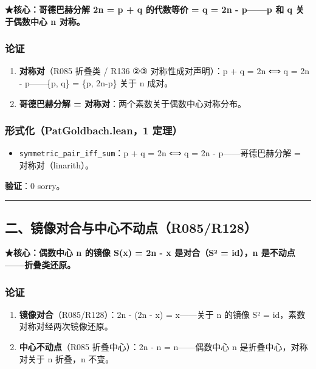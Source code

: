 \documentclass[
]{article}
\providecommand{\tightlist}{%
  \setlength{\itemsep}{0pt}\setlength{\parskip}{0pt}}
\begin{document}
\textbf{★核心：哥德巴赫分解 2n = p + q 的代数等价 = q = 2n - p------p 和
q 关于偶数中心 n 对称。}

\subsubsection{论证}\label{ux8bbaux8bc1}

\begin{enumerate}
\def\labelenumi{\arabic{enumi}.}
\tightlist
\item
  \textbf{对称对}（R085 折叠类 / R136 ②③ 对称性成对声明）：p + q = 2n ⟺
  q = 2n - p------\{p, q\} = \{p, 2n-p\} 关于 n 成对。
\item
  \textbf{哥德巴赫分解 = 对称对}：两个素数关于偶数中心对称分布。
\end{enumerate}

\subsubsection{形式化（PatGoldbach.lean，1
定理）}\label{ux5f62ux5f0fux5316patgoldbach.lean1-ux5b9aux7406}

\begin{itemize}
\tightlist
\item
  \texttt{symmetric\_pair\_iff\_sum}：p + q = 2n ⟺ q = 2n -
  p------哥德巴赫分解 = 对称对（linarith）。
\end{itemize}

\textbf{验证}：0 sorry。

\begin{center}\rule{0.5\linewidth}{0.5pt}\end{center}

\subsection{二、镜像对合与中心不动点（R085/R128）}\label{ux4e8cux955cux50cfux5bf9ux5408ux4e0eux4e2dux5fc3ux4e0dux52a8ux70b9r085r128}

\textbf{★核心：偶数中心 n 的镜像 S(x) = 2n - x 是对合（S² = id），n
是不动点------折叠类还原。}

\subsubsection{论证}\label{ux8bbaux8bc1-1}

\begin{enumerate}
\def\labelenumi{\arabic{enumi}.}
\tightlist
\item
  \textbf{镜像对合}（R085/R128）：2n - (2n - x) = x------关于 n 的镜像
  S² = id，素数对称对经两次镜像还原。
\item
  \textbf{中心不动点}（R085 折叠中心）：2n - n = n------偶数中心 n
  是折叠中心，对称对关于 n 折叠，n 不变。
\end{enumerate}
\end{document}
